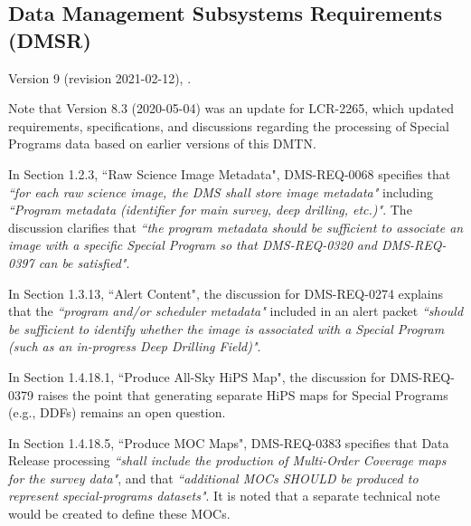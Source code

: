 


\subsection{Data Management Subsystems Requirements (DMSR)}

Version 9 (revision 2021-02-12), . 

Note that Version 8.3 (2020-05-04) was an update for LCR-2265, which updated requirements, specifications, and discussions regarding the processing of Special Programs data based on earlier versions of this DMTN.

In Section 1.2.3, ``Raw Science Image Metadata", DMS-REQ-0068 specifies that {\it ``for each raw science image, the DMS shall store image metadata"} including {\it ``Program metadata (identifier for main survey, deep drilling, etc.)"}.
The discussion clarifies that {\it ``the program metadata should be sufficient to associate an image with a specific Special Program so that DMS-REQ-0320 and DMS-REQ-0397 can be satisfied"}.

In Section 1.3.13, ``Alert Content", the discussion for DMS-REQ-0274 explains that the {\it ``program and/or scheduler metadata"} included in an alert packet {\it ``should be sufficient to identify whether the image is associated with a Special Program (such as an in-progress Deep Drilling Field)"}.

In Section 1.4.18.1, ``Produce All-Sky HiPS Map", the discussion for DMS-REQ-0379 raises the point that generating separate HiPS maps for Special Programs (e.g., DDFs) remains an open question.

In Section 1.4.18.5, ``Produce MOC Maps", DMS-REQ-0383 specifies that Data Release processing {\it ``shall include the production of Multi-Order Coverage maps for the survey data"}, and that {\it ``additional MOCs SHOULD be produced to represent special-programs datasets"}.
It is noted that a separate technical note would be created to define these MOCs.

